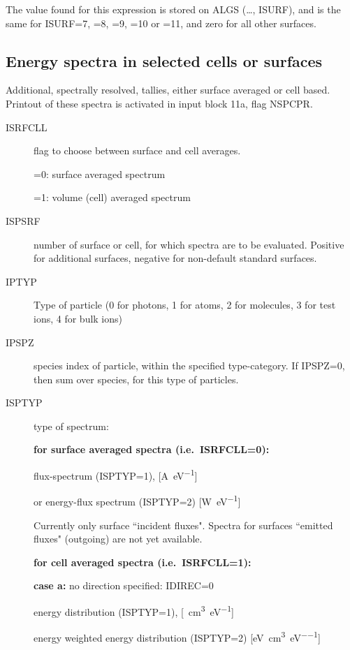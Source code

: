 The value found for this expression is stored on ALGS (\dots, ISURF), and is
the same for ISURF=7, =8, =9, =10 or =11, and zero for all other surfaces.

\subsection{Energy spectra in selected cells or surfaces}\label{sec2.10G}

Additional, spectrally resolved, tallies, either surface averaged or cell
based.
Printout of these spectra is activated in input block 11a, flag NSPCPR.

\begin{description}
  \item[ISRFCLL] flag to choose between surface and cell averages.

        =0:  surface averaged spectrum

        =1:  volume (cell) averaged spectrum
  \item[ISPSRF]
        number of surface or cell, for which spectra are to be evaluated.
        Positive for additional surfaces, negative for non-default standard surfaces.
  \item[IPTYP] Type of particle (0 for photons, 1 for atoms, 2 for molecules, 3
        for test ions, 4 for bulk ions)
  \item[IPSPZ] species index of particle, within
        the specified type-category.
        If IPSPZ=0, then sum over species, for this type of particles.

  \item[ISPTYP] type of spectrum:

        \textbf{for surface averaged spectra (i.e.\ ISRFCLL=0):} 

        flux-spectrum (ISPTYP=1), [\si{\ampere\per\electronvolt}] 

        or energy-flux spectrum (ISPTYP=2) [\si{\watt\per\electronvolt}]

        Currently only surface ``incident fluxes".
        Spectra for surfaces ``emitted fluxes" (outgoing) are not yet available.

        \textbf{for cell averaged spectra (i.e.\ ISRFCLL=1):} 

        \textbf{case a:} no direction specified: IDIREC=0 

        energy distribution (ISPTYP=1), [\si{\per\cubic\centi\metre\per\electronvolt}]

        energy weighted energy distribution (ISPTYP=2)
        [\si{\electronvolt\per\cubic\centi\metre\per\electronvolt}] 


\end{description}
